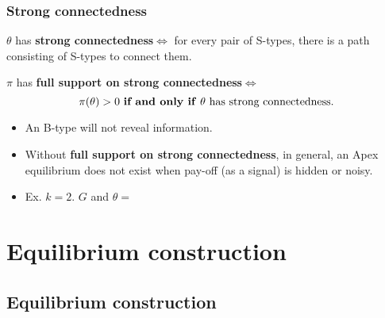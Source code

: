 \documentclass[9pt]{beamer}
\begin{document}
\begin{frame}
  \frametitle{Strong connectedness}


\begin{definition}
$\theta$ has \textbf{strong connectedness}$\Leftrightarrow$ for every pair of S-types, there is a path consisting of S-types to connect them.
\end{definition}  

\begin{definition}
$\pi$ has \textbf{full support on strong connectedness}$\Leftrightarrow$ 
\[\text{$\pi(\theta)>0$ \textbf{if and only if} $\theta$ has strong connectedness.}\]
\end{definition}  
\pause

\begin{itemize}
\item An B-type will not reveal information.
\item Without \textbf{full support on strong connectedness}, in general, an Apex equilibrium does not exist when pay-off (as a signal) is hidden or noisy.
\item Ex. $k=2$. $G$ and $\theta=$
\begin{center}
\end{center}
\end{itemize}
\end{frame}




\section{Equilibrium construction}
\subsection{Equilibrium construction}
\end{document}
